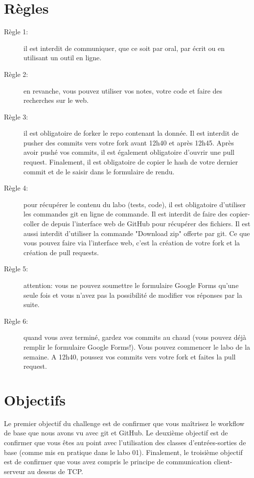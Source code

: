 \documentclass[a4paper, french, 10pt]{article} %
\begin{document}
\section{Règles}

\begin{framed}
\begin{description}
\item[Règle 1:] il est interdit de communiquer, que ce soit par oral, par écrit ou en utilisant un outil en ligne.
\item[Règle 2:] en revanche, vous pouvez utiliser vos notes, votre code et faire des recherches sur le web.
\item[Règle 3:] il est obligatoire de forker le repo contenant la donnée. Il est interdit de pusher des commits vers votre fork avant 12h40 et après 12h45. Après avoir pushé vos commits, il est également obligatoire d'ouvrir une pull request. Finalement, il est obligatoire de copier le hash de votre dernier commit et de le saisir dans le formulaire de rendu.
\item[Règle 4:] pour récupérer le contenu du labo (tests, code), il est obligatoire d'utiliser les commandes git en ligne de commande. Il est interdit de faire des copier-coller de depuis l'interface web de GitHub pour récupérer des fichiers. Il est aussi interdit d'utiliser la commande "Download zip" offerte par git. Ce que vous pouvez faire via l'interface web, c'est la création de votre fork et la création de pull requests.
\item[Règle 5:] attention: vous ne pouvez soumettre le formulaire Google Forms qu'une seule fois et vous n'avez pas la possibilité de modifier vos réponses par la suite.
\item[Règle 6:] quand vous avez terminé, gardez vos commits au chaud (vous pouvez déjà remplir le formulaire Google Forms!). Vous pouvez commencer le labo de la semaine. A 12h40, poussez vos commits vers votre fork et faites la pull request. 
\end{description}
\end{framed}

\section{Objectifs}

Le premier objectif du challenge est de confirmer que vous maîtrisez le workflow de base que nous avons vu avec git et GitHub. Le deuxième objectif est de confirmer que vous êtes au point avec l'utilisation des classes d'entrées-sorties de base (comme mis en pratique dans le labo 01). Finalement, le troisième objectif est de confirmer que vous avez compris le principe de communication client-serveur au dessus de TCP.
\end{document}
